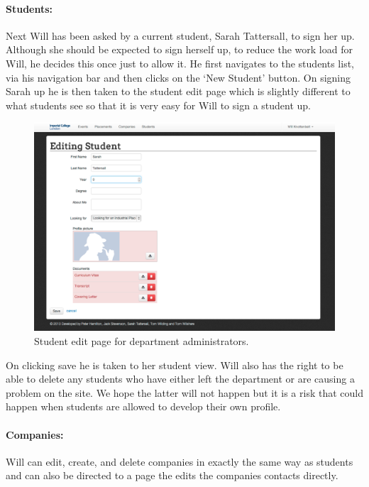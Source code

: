   \paragraph{Students:}
    Next Will has been asked by a current student, Sarah Tattersall, to sign her up. Although she should be expected to sign herself up, to reduce the work load for Will, he decides this once just to allow it.
    He first navigates to the students list, via his navigation bar and then clicks on the `New Student' button.
    On signing Sarah up he is then taken to the student edit page which is slightly different to what students see so that it is very easy for Will to sign a student up.

    \begin{figure}[H]\centering
    \includegraphics[scale=0.5]{images/user_experiences/admin/admin_student_edit}
    \caption{Student edit page for department administrators.}
    \end{figure}

    On clicking save he is taken to her student view. Will also has the right to be able to delete any students who have either left the department or are causing a problem on the site. We hope the latter will not happen but it is a risk that could happen when students are allowed to develop their own profile.

  \paragraph{Companies:}
    Will can edit, create, and delete companies in exactly the same way as students and can also be directed to a page the edits the companies contacts directly. 

